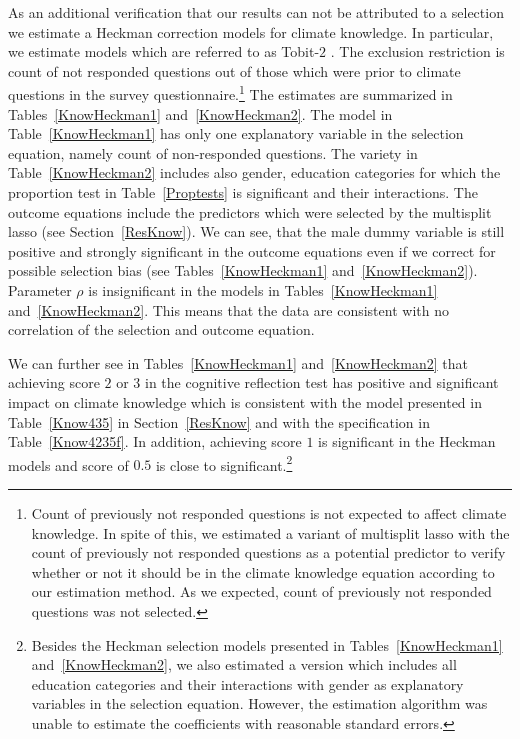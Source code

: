 \documentclass[a4paper,12pt]{article}
\begin{document}
As an additional verification that our results can not be attributed to a selection we estimate a Heckman correction models for climate knowledge. In particular, we estimate models which are referred to as Tobit-$2$ \citep{HeckmanR}. The exclusion restriction is count of not responded questions out of those which were prior to climate questions in the survey questionnaire.\footnote{Count of previously not responded questions is not expected to affect climate knowledge. In spite of this, we estimated a variant of multisplit lasso with the count of previously not responded questions as a potential predictor to verify whether or not it should be in the climate knowledge equation according to our estimation method. As we expected, count of previously not responded questions was not selected.} The estimates are summarized in Tables~\ref{KnowHeckman1} and~\ref{KnowHeckman2}. The model in Table~\ref{KnowHeckman1} has only one explanatory variable in the selection equation, namely count of non-responded questions. The variety in Table~\ref{KnowHeckman2} includes also gender, education categories for which the proportion test in Table~\ref{Proptests} is significant and their interactions. The outcome equations include the predictors which were selected by the multisplit lasso (see Section~\ref{ResKnow}). We can see, that the male dummy variable is still positive and strongly significant in the outcome equations even if we correct for possible selection bias (see Tables~\ref{KnowHeckman1} and~\ref{KnowHeckman2}). Parameter $\rho$ is insignificant in the models in Tables~\ref{KnowHeckman1} and~\ref{KnowHeckman2}. This means that the data are consistent with no correlation of the selection and outcome equation.




We can further see in Tables~\ref{KnowHeckman1} and~\ref{KnowHeckman2} that achieving score $2$ or $3$ in the cognitive reflection test has positive and significant impact on climate knowledge which is consistent with the model presented in Table~\ref{Know435} in Section~\ref{ResKnow} and with the specification in Table~\ref{Know4235f}. In addition, achieving score $1$ is significant in the Heckman models and score of $0.5$ is close to significant.\footnote{Besides the Heckman selection models presented in Tables~\ref{KnowHeckman1} and~\ref{KnowHeckman2}, we also estimated a version which includes all education categories and their interactions with gender as explanatory variables in the selection equation. However, the estimation algorithm was unable to estimate the coefficients with reasonable standard errors.}
\end{document}
